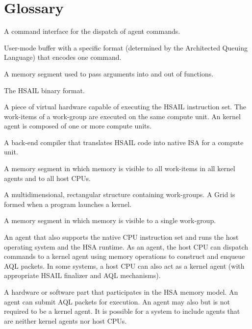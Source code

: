 \documentclass[final,oneside]{book}
\begin{document}
\chapter{Glossary}
\begin{description}[itemsep=5pt,leftmargin=0cm, labelindent=0cm]

\item[Architected Queuing Language (AQL)] A command interface for the dispatch
  of agent commands.

\item[AQL packet] User-mode buffer with a specific format (determined by the
  Architected Queuing Language) that encodes one command.

\item[Arg segment] A memory segment used to pass arguments into and out of
  functions.

\item[BRIG] The HSAIL binary format.

\item[Compute unit] A piece of virtual hardware capable of executing the HSAIL
  instruction set. The work-items of a work-group are executed on the same
  compute unit. An kernel agent is composed of one or more compute units.

\item[Finalizer] A back-end compiler that translates HSAIL code into native ISA
  for a compute unit.

\item[Global segment] A memory segment in which memory is visible to all
  work-items in all kernel agents and to all host CPUs.

\item[Grid] A multidimensional, rectangular structure containing work-groups. A
  Grid is formed when a program launches a kernel.

\item[Group segment] A memory segment in which memory is visible to a single
  work-group.

\item[Host CPU] An agent that also supports the native CPU instruction set
  and runs the host operating system and the HSA runtime. As an agent, the
  host CPU can dispatch commands to a kernel agent using memory operations to
  construct and enqueue AQL packets. In some systems, a host CPU can also act as
  a kernel agent (with appropriate HSAIL finalizer and AQL mechanisms).

\item[Agent] A hardware or software part that participates in the HSA
  memory model. An agent can submit AQL packets for execution. An agent
  may also but is not required to be a kernel agent. It is possible for a
  system to include agents that are neither kernel agents nor host CPUs.


\end{description}
\end{document}
